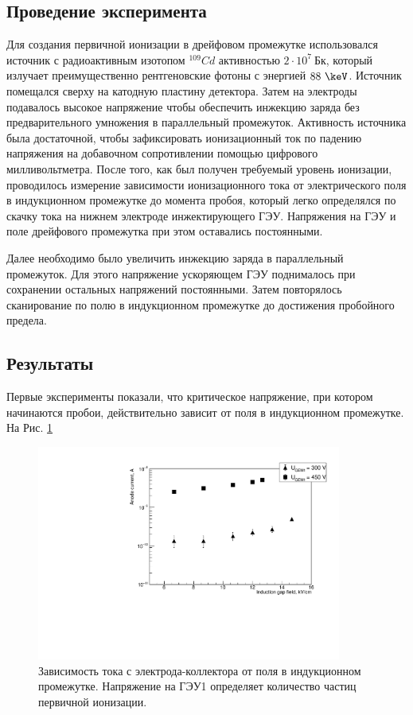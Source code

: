 \subsection{Проведение эксперимента}
Для создания первичной ионизации в дрейфовом промежутке использовался источник с радиоактивным изотопом $^{109}Cd$ активностью $2\cdot10^7~\text{Бк}$, который излучает преимущественно рентгеновские фотоны с энергией $88~\keV$. Источник помещался сверху на катодную пластину детектора. Затем на электроды подавалось высокое напряжение чтобы обеспечить инжекцию заряда без предварительного умножения в параллельный промежуток. Активность источника была достаточной, чтобы  зафиксировать ионизационный ток по падению напряжения на добавочном сопротивлении помощью цифрового милливольтметра. После того, как был получен требуемый уровень ионизации, проводилось измерение зависимости ионизационного тока от электрического поля в индукционном промежутке до момента пробоя, который легко определялся по скачку тока на нижнем электроде инжектирующего ГЭУ. Напряжения на ГЭУ и поле дрейфового промежутка при этом оставались постоянными. 
\par Далее необходимо было увеличить инжекцию заряда в параллельный промежуток. Для этого напряжение ускоряющем ГЭУ поднималось при сохранении остальных напряжений постоянными. Затем повторялось сканирование по полю в индукционном промежутке до достижения пробойного предела.

\subsection{Результаты}
Первые эксперименты показали, что критическое напряжение, при котором начинаются пробои, действительно зависит от поля в индукционном промежутке. На Рис. \ref{Raether_graph_2}
\begin{figure}[H]
	\begin{center}
		\includegraphics[width = 10cm]{img/Raether_graph_2.pdf}
		\caption{Зависимость тока с электрода-коллектора от поля в индукционном промежутке. Напряжение на ГЭУ1 определяет количество частиц первичной ионизации.}
		\label{Raether_graph_2}
	\end{center}
\end{figure}

